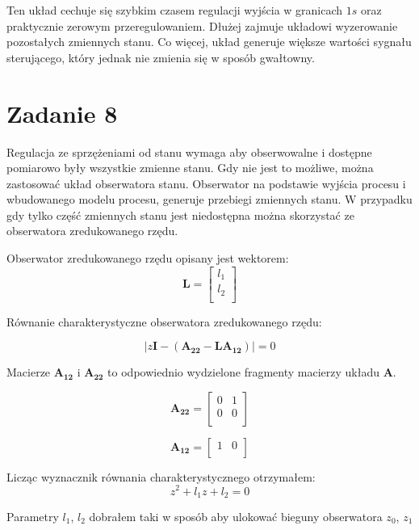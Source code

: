 \documentclass[a4paper,titlepage,11pt,floatssmall]{mwrep}
\begin{document}
Ten układ cechuje się szybkim czasem regulacji wyjścia w granicach $1s$ oraz praktycznie zerowym przeregulowaniem. Dłużej zajmuje układowi wyzerowanie pozostałych zmiennych stanu. Co więcej, układ generuje większe wartości sygnału sterującego, który jednak nie zmienia się w sposób gwałtowny. 

\section{Zadanie 8}
\indent Regulacja ze sprzężeniami od stanu wymaga aby obserwowalne i dostępne pomiarowo były wszystkie zmienne stanu. Gdy nie jest to możliwe, można zastosować układ obserwatora stanu. Obserwator na podstawie wyjścia procesu i wbudowanego modelu procesu, generuje przebiegi zmiennych stanu. W przypadku gdy tylko część zmiennych stanu jest niedostępna można skorzystać ze obserwatora zredukowanego rzędu.

Obserwator zredukowanego rzędu opisany jest wektorem:
\[
\mathbf{L} = 
\begin{bmatrix}
    l_1 \\
    l_2 \\     
\end{bmatrix}
\]

Równanie charakterystyczne obserwatora zredukowanego rzędu: 

\begin{equation*}
\big| z\mathbf{I} - (\mathbf{A_{22}} - \mathbf{L}\mathbf{A_{12}}) \big| = 0 
\end{equation*}

\newpage
Macierze $\mathbf{A_{12}}$ i $\mathbf{A_{22}}$ to odpowiednio wydzielone fragmenty macierzy układu $\mathbf{A}$.

\[
\mathbf{A_{22}} = 
\begin{bmatrix}
    0 & 1 \\
    0 & 0 \\     
\end{bmatrix}
\]

\[
\mathbf{A_{12}} = 
\begin{bmatrix}
    1 & 0 \\    
\end{bmatrix}
\]

Licząc wyznacznik równania charakterystycznego otrzymałem: 
\begin{equation*}
z^2 + l_1z + l_2 = 0 
\end{equation*}

Parametry $l_1$, $l_2$ dobrałem taki w sposób aby ulokować bieguny obserwatora $z_0$, $z_1$ 
\end{document}
